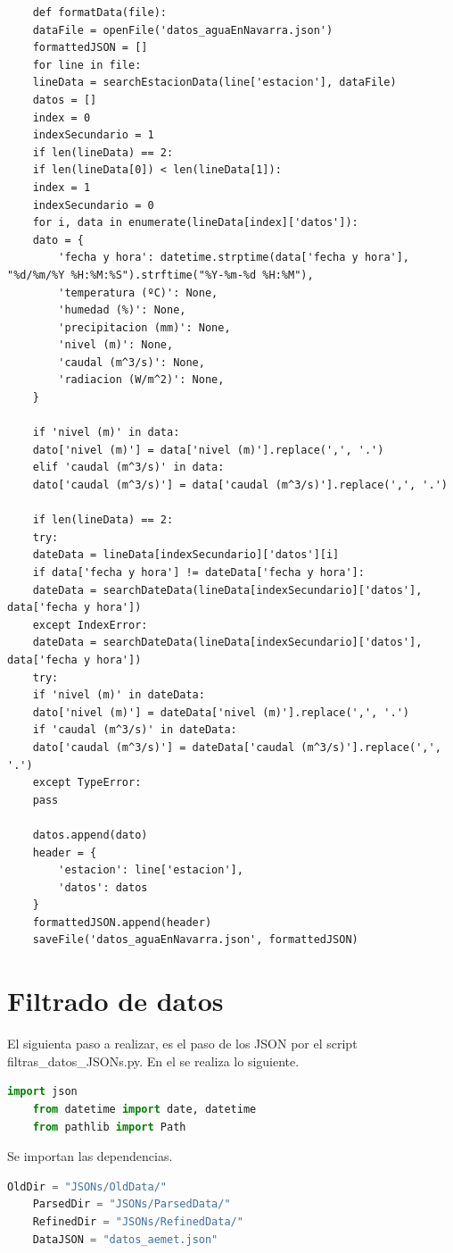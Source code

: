 \begin{lstlisting}
	def formatData(file):
	dataFile = openFile('datos_aguaEnNavarra.json')
	formattedJSON = []
	for line in file:
	lineData = searchEstacionData(line['estacion'], dataFile)
	datos = []
	index = 0
	indexSecundario = 1
	if len(lineData) == 2:
	if len(lineData[0]) < len(lineData[1]):
	index = 1
	indexSecundario = 0
	for i, data in enumerate(lineData[index]['datos']):
	dato = {
		'fecha y hora': datetime.strptime(data['fecha y hora'], "%d/%m/%Y %H:%M:%S").strftime("%Y-%m-%d %H:%M"),
		'temperatura (ºC)': None,
		'humedad (%)': None,
		'precipitacion (mm)': None,
		'nivel (m)': None,
		'caudal (m^3/s)': None,
		'radiacion (W/m^2)': None,
	}
	
	if 'nivel (m)' in data:
	dato['nivel (m)'] = data['nivel (m)'].replace(',', '.')
	elif 'caudal (m^3/s)' in data:
	dato['caudal (m^3/s)'] = data['caudal (m^3/s)'].replace(',', '.')
	
	if len(lineData) == 2:
	try:
	dateData = lineData[indexSecundario]['datos'][i]
	if data['fecha y hora'] != dateData['fecha y hora']:
	dateData = searchDateData(lineData[indexSecundario]['datos'], data['fecha y hora'])
	except IndexError:
	dateData = searchDateData(lineData[indexSecundario]['datos'], data['fecha y hora'])
	try:
	if 'nivel (m)' in dateData:
	dato['nivel (m)'] = dateData['nivel (m)'].replace(',', '.')
	if 'caudal (m^3/s)' in dateData:
	dato['caudal (m^3/s)'] = dateData['caudal (m^3/s)'].replace(',', '.')
	except TypeError:
	pass
	
	datos.append(dato)
	header = {
		'estacion': line['estacion'],
		'datos': datos
	}
	formattedJSON.append(header)
	saveFile('datos_aguaEnNavarra.json', formattedJSON)
\end{lstlisting}

\section{Filtrado de datos}
El siguienta paso a realizar, es el paso de los JSON por el script filtras\_datos\_JSONs.py. En el se realiza lo siguiente.

\begin{lstlisting}[language=Python, caption={Import necesarios filtrado de datos}]
	import json
	from datetime import date, datetime
	from pathlib import Path
\end{lstlisting}

Se importan las dependencias.

\begin{lstlisting}[language=Python, caption={Declaración rutas JSONs y nombre de fichero}]
	OldDir = "JSONs/OldData/"
	ParsedDir = "JSONs/ParsedData/"
	RefinedDir = "JSONs/RefinedData/"
	DataJSON = "datos_aemet.json"
\end{lstlisting}

